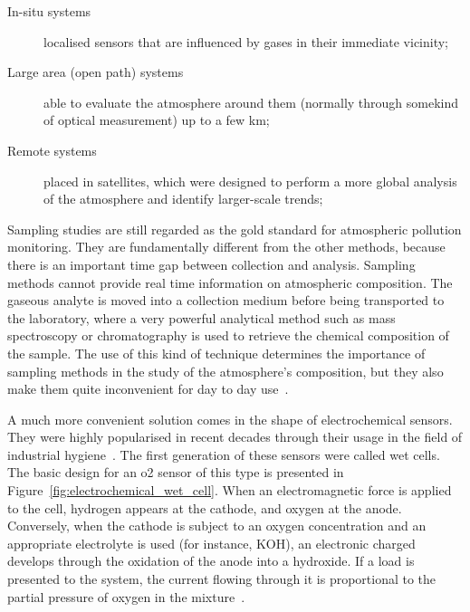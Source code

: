\begin{description}
    \item[In-situ systems] localised sensors that are influenced by
        gases in their immediate vicinity;
    \item[Large area (open path) systems] able to evaluate the
        atmosphere around them (normally through somekind of optical
        measurement) up to a few km;
    \item[Remote systems] placed in satellites, which were designed to
        perform a more global analysis of the atmosphere and identify
        larger-scale trends;
\end{description}


Sampling studies are still regarded as the gold standard for atmospheric
pollution monitoring. They are fundamentally different from the other
methods, because there is an important time gap between collection and
analysis. Sampling methods cannot provide real time information on
atmospheric composition. The gaseous analyte is moved into a collection
medium before being transported to the laboratory, where a very powerful
analytical method such as mass spectroscopy or chromatography is used to
retrieve the chemical composition of the sample. The use of this kind of
technique determines the importance of sampling methods in the study of
the atmosphere's composition, but they also make them quite inconvenient
for day to day use~\cite{Vallero2014}.

A much more convenient solution comes in the shape of electrochemical
sensors. They were highly popularised in recent decades through their
usage in the field of industrial hygiene~\cite{Clark1997}. The first
generation of these sensors were called wet cells. The basic design for
an \gls{o2} sensor of this type is presented in
Figure~\ref{fig:electrochemical_wet_cell}. When an electromagnetic force
is applied to the cell, hydrogen appears at the cathode, and oxygen at
the anode. Conversely, when the cathode is subject to an oxygen
concentration and an appropriate electrolyte is used (for instance,
KOH), an electronic charged develops through the oxidation of the anode
into a hydroxide. If a load is presented to the system, the current
flowing through it is proportional to the partial pressure of oxygen in
the mixture~\cite{Dhall2021, Clark1997}.

